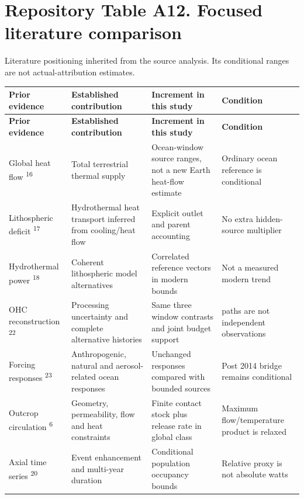 \documentclass[11pt,a4paper]{article}
\begin{document}
\section*{Repository Table A12. Focused literature comparison}
Literature positioning inherited from the source analysis. Its conditional ranges are not actual-attribution estimates.\par
{\fontsize{8.3}{10.1}\selectfont\begin{longtable}{>{\raggedright\arraybackslash}p{29.076mm}>{\raggedright\arraybackslash}p{40.383mm}>{\raggedright\arraybackslash}p{51.691mm}>{\raggedright\arraybackslash}p{40.383mm}}\toprule
\textbf{Prior evidence} & \textbf{Established contribution} & \textbf{Increment in this study} & \textbf{Condition}\\\midrule\endfirsthead
\textbf{Prior evidence} & \textbf{Established contribution} & \textbf{Increment in this study} & \textbf{Condition}\\\midrule\endhead
\bottomrule\endfoot
Global heat flow \textsuperscript{16} & Total terrestrial thermal supply & Ocean-window source ranges, not a new Earth heat-flow estimate & Ordinary ocean reference is conditional\\
Lithospheric deficit \textsuperscript{17} & Hydrothermal heat transport inferred from cooling/\allowbreak{}heat flow & Explicit outlet and parent accounting & No extra hidden-source multiplier\\
Hydrothermal power \textsuperscript{18} & Coherent lithospheric model alternatives & Correlated reference vectors in modern bounds & Not a measured modern trend\\
OHC reconstruction \textsuperscript{22} & Processing uncertainty and complete alternative histories & Same three window contrasts and joint budget support & 908 paths are not independent observations\\
Forcing responses \textsuperscript{23} & Anthropogenic, natural and aerosol-related ocean responses & Unchanged responses compared with bounded sources & Post 2014 bridge remains conditional\\
Outcrop circulation \textsuperscript{6} & Geometry, permeability, flow and heat constraints & Finite contact stock plus release rate in global class & Maximum flow/\allowbreak{}temperature product is relaxed\\
Axial time series \textsuperscript{20} & Event enhancement and multi-year duration & Conditional population occupancy bounds & Relative proxy is not absolute watts\\

\end{longtable}}
\end{document}
